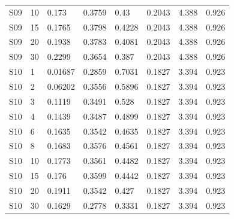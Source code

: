{\begin{longtable}
{}S09 & 10 & 0.173 & 0.3759 & 0.43 & 0.2043 & 4.388 & 0.926\\
{}S09 & 15 & 0.1765 & 0.3798 & 0.4228 & 0.2043 & 4.388 & 0.926\\
{}S09 & 20 & 0.1938 & 0.3783 & 0.4081 & 0.2043 & 4.388 & 0.926\\
{}S09 & 30 & 0.2299 & 0.3654 & 0.387 & 0.2043 & 4.388 & 0.926\\
{}S10 & 1 & 0.01687 & 0.2859 & 0.7031 & 0.1827 & 3.394 & 0.923\\
{}S10 & 2 & 0.06202 & 0.3556 & 0.5896 & 0.1827 & 3.394 & 0.923\\
{}S10 & 3 & 0.1119 & 0.3491 & 0.528 & 0.1827 & 3.394 & 0.923\\
{}S10 & 4 & 0.1439 & 0.3487 & 0.4899 & 0.1827 & 3.394 & 0.923\\
{}S10 & 6 & 0.1635 & 0.3542 & 0.4635 & 0.1827 & 3.394 & 0.923\\
{}S10 & 8 & 0.1683 & 0.3576 & 0.4561 & 0.1827 & 3.394 & 0.923\\
{}S10 & 10 & 0.1773 & 0.3561 & 0.4482 & 0.1827 & 3.394 & 0.923\\
{}S10 & 15 & 0.176 & 0.3599 & 0.4442 & 0.1827 & 3.394 & 0.923\\
{}S10 & 20 & 0.1911 & 0.3542 & 0.427 & 0.1827 & 3.394 & 0.923\\
{}S10 & 30 & 0.1629 & 0.2778 & 0.3331 & 0.1827 & 3.394 & 0.923\\
\bottomrule
\end{longtable}}

